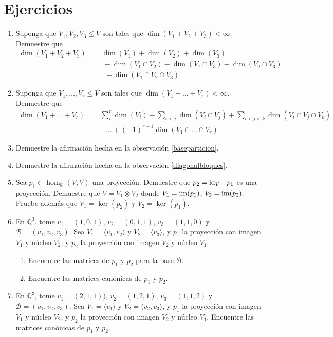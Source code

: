 \section*{Ejercicios}
\begin{enumerate}
  \item Suponga que $V_1,V_2,V_3\le V$ son tales que $\dim(V_1+V_2+V_3)< \infty$. Demuestre que
  \begin{align*}
    \dim(V_1+V_2+V_3) = & \dim(V_1)+\dim(V_2)+\dim(V_3)\\
      & \ -\dim(V_1\cap V_2)-\dim(V_1\cap V_3)-\dim(V_2\cap V_3)\\
      & \ \ +\dim(V_1\cap V_2\cap V_3)
  \end{align*}
  \item Suponga que $V_1,\ldots,V_r\le V$ son tales que $\dim(V_1+\ldots+V_r)< \infty$. Demuestre que
  \begin{align*}
    \dim(V_1+\ldots+V_r) = & \sum_{i}^r\dim(V_i)-\sum_{i<j}\dim(V_i\cap V_j)+\sum_{i<j<k}\dim(V_i\cap V_j\cap V_k)\\
      & -\ldots+(-1)^{r-1}\dim(V_1\cap \ldots\cap V_r)
  \end{align*}
  \item Demuestre la afirmación hecha en la observación \ref{baseparticion}.
  \item Demuestre la afirmación hecha en la observación \ref{diagonalbloques}.
  \item Sea $p_1\in\hom_\mathbb{K}(V,V)$ una proyección. Demuestre que $p_2=\operatorname{id}_V-p_1$ es una proyección. Demuestre que $V=V_1\otimes V_2$ donde $V_1=\operatorname{im}(p_1)$, $V_2=\operatorname{im}(p_2)$. Pruebe además que $V_1=\ker(p_2)$ y $V_2=\ker(p_1)$.
  \item En $\mathbb{Q}^3$, tome $v_1=(1,0,1)$, $v_2=(0,1,1)$, $v_3=(1,1,0)$ y $\mathcal{B}=(v_1,v_2,v_3)$. Sea $V_1=\langle v_1,v_2\rangle$ y $V_2=\langle v_3\rangle$, y $p_1$ la proyección con imagen $V_1$ y núcleo $V_2$, y $p_2$ la proyección con imagen $V_2$ y núcleo $V_1$. 
    \begin{enumerate}
      \item Encuentre las matrices de $p_1$ y $p_2$ para la base $\mathcal{B}$.
      \item Encuentre las matrices canónicas de $p_1$ y $p_2$.
    \end{enumerate}
  \item En $\mathbb{Q}^3$, tome $v_1=(2,1,1))$, $v_2=(1,2,1)$, $v_3=(1,1,2)$ y $\mathcal{B}=(v_1,v_2,v_3)$. Sea $V_1=\langle v_1\rangle$ y $V_2=\langle v_2,v_3\rangle$, y $p_1$ la proyección con imagen $V_1$ y núcleo $V_2$, y $p_2$ la proyección con imagen $V_2$ y núcleo $V_1$. Encuentre las matrices canónicas de $p_1$ y $p_2$.

\end{enumerate}
